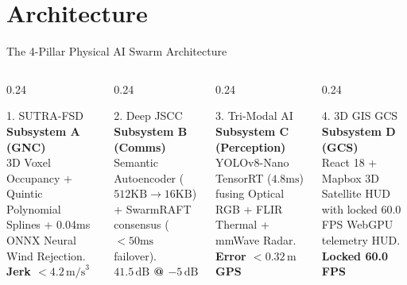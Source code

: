 \documentclass[aspectratio=169, 10pt]{beamer}
\begin{document}
\section{Architecture}
\begin{frame}{The 4-Pillar Physical AI Swarm Architecture}
  \begin{columns}[T]
    \begin{column}{0.24\textwidth}
      \begin{defensecard}{1. SUTRA-FSD}
        {\tiny
          \textbf{Subsystem A (GNC)}\\
          3D Voxel Occupancy + Quintic Polynomial Splines + 0.04ms ONNX Neural Wind Rejection.
          \vspace{0.1cm}\\
          \textbf{\color{EmeraldGreen} Jerk $< 4.2\,\text{m/s}^3$}
        }
      \end{defensecard}
    \end{column}

    \begin{column}{0.24\textwidth}
      \begin{defensecard}{2. Deep JSCC}
        {\tiny
          \textbf{Subsystem B (Comms)}\\
          Semantic Autoencoder ($512\text{KB}\to 16\text{KB}$) + SwarmRAFT consensus ($<50\text{ms}$ failover).
          \vspace{0.1cm}\\
          \textbf{\color{EmeraldGreen} $41.5\,\text{dB}$ @ $-5\,\text{dB}$}
        }
      \end{defensecard}
    \end{column}

    \begin{column}{0.24\textwidth}
      \begin{defensecard}{3. Tri-Modal AI}
        {\tiny
          \textbf{Subsystem C (Perception)}\\
          YOLOv8-Nano TensorRT ($4.8\text{ms}$) fusing Optical RGB + FLIR Thermal + mmWave Radar.
          \vspace{0.1cm}\\
          \textbf{\color{EmeraldGreen} Error $< 0.32\,\text{m}$ GPS}
        }
      \end{defensecard}
    \end{column}

    \begin{column}{0.24\textwidth}
      \begin{defensecard}{4. 3D GIS GCS}
        {\tiny
          \textbf{Subsystem D (GCS)}\\
          React 18 + Mapbox 3D Satellite HUD with locked 60.0 FPS WebGPU telemetry HUD.
          \vspace{0.1cm}\\
          \textbf{\color{EmeraldGreen} Locked 60.0 FPS}
        }
      \end{defensecard}
    \end{column}
  \end{columns}


\end{frame}
\end{document}
